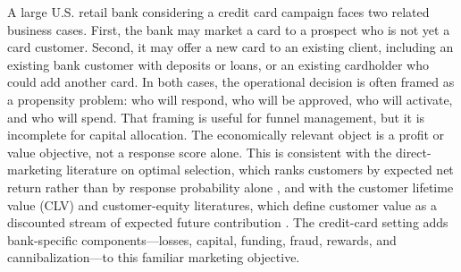 \documentclass[11pt]{article}
\newcommand{\1}{\mathbf{1}}
\begin{document}
A large U.S. retail bank considering a credit card campaign faces two related
business cases. First, the bank may market a card to a prospect who is not yet a
card customer. Second, it may offer a new card to an existing client, including
an existing bank customer with deposits or loans, or an existing cardholder who
could add another card. In both cases, the operational decision is often framed
as a propensity problem: who will respond, who will be approved, who will
activate, and who will spend. That framing is useful for funnel management, but
it is incomplete for capital allocation. The economically relevant object is a
profit or value objective, not a response score alone. This is consistent with
the direct-marketing literature on optimal selection, which ranks customers by
expected net return rather than by response probability alone
\citep{bult1995directmail}, and with the customer lifetime value (CLV) and
customer-equity literatures, which define customer value as a discounted stream
of expected future contribution \citep{berger1998clv,rust2004return,venkatesan2004clv}.
The credit-card setting adds bank-specific components---losses, capital,
funding, fraud, rewards, and cannibalization---to this familiar marketing
objective.
\end{document}
